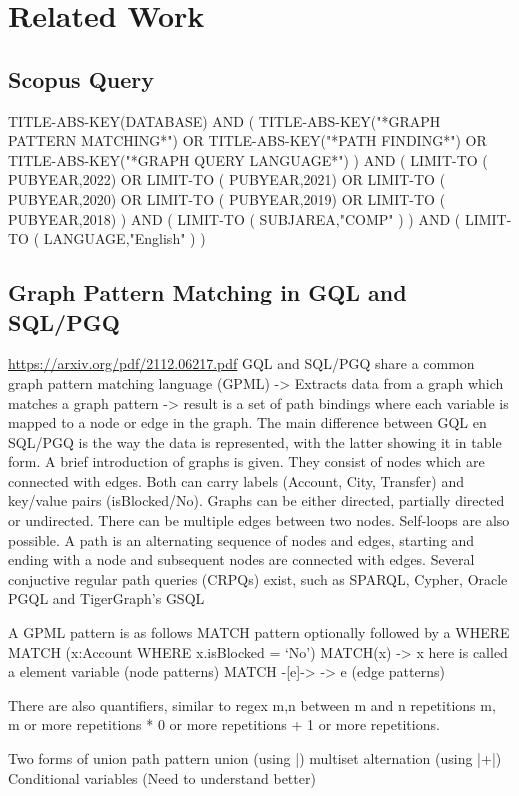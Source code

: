 \section{Related Work}\label{s:related}
\subsection{Scopus Query}
TITLE-ABS-KEY(DATABASE) AND ( TITLE-ABS-KEY("*GRAPH PATTERN MATCHING*") OR TITLE-ABS-KEY("*PATH FINDING*") OR TITLE-ABS-KEY("*GRAPH QUERY LANGUAGE*") ) AND ( LIMIT-TO ( PUBYEAR,2022) OR LIMIT-TO ( PUBYEAR,2021) OR LIMIT-TO ( PUBYEAR,2020) OR LIMIT-TO ( PUBYEAR,2019) OR LIMIT-TO ( PUBYEAR,2018) ) AND ( LIMIT-TO ( SUBJAREA,"COMP" ) ) AND ( LIMIT-TO ( LANGUAGE,"English" ) )

\subsection{Graph Pattern Matching in GQL and SQL/PGQ}

\url{https://arxiv.org/pdf/2112.06217.pdf} 
GQL and SQL/PGQ share a common graph pattern matching language (GPML) -> Extracts data from a graph which matches a graph pattern -> result is a set of path bindings where each variable is mapped to a node or edge in the graph. The main difference between GQL en SQL/PGQ is the way the data is represented, with the latter showing it in table form. 
A brief introduction of graphs is given. They consist of nodes which are connected with edges. Both can carry labels (Account, City, Transfer) and key/value pairs (isBlocked/No). Graphs can be either directed, partially directed or undirected. There can be multiple edges between two nodes. Self-loops are also possible. A path is an alternating sequence of nodes and edges, starting and ending with a node and subsequent nodes are connected with edges.
Several conjuctive regular path queries (CRPQs) exist, such as SPARQL, Cypher, Oracle PGQL and TigerGraph’s GSQL

A GPML pattern is as follows MATCH pattern optionally followed by a WHERE 
	MATCH (x:Account WHERE x.isBlocked = ‘No’)
	MATCH(x) -> x here is called a element variable (node patterns)
	MATCH -[e]-> -> e (edge patterns)

There are also quantifiers, similar to regex
{m,n} between m and n repetitions
{m, } m or more repetitions
* 0 or more repetitions
+ 1 or more repetitions. 

Two forms of union
path pattern union (using |)
multiset alternation (using |+|)
Conditional variables (Need to understand better)


